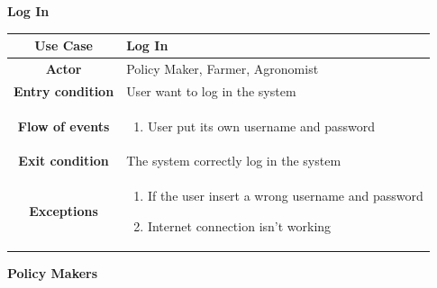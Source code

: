 \documentclass[table, 12pt]{article}
\begin{document}
\begin{itemize}
            \begin{table}[H]
                \item[] \textbf{Log In}
                \item[]  
                \centering
                \begin{tabular}{|c| m{}|}
                    \hline
                    \textbf{Use Case} & Log In\\ \hline
                    \textbf{Actor} & Policy Maker, Farmer, Agronomist\\ \hline
                    \textbf{Entry condition} & User want to log in the system\\  \hline
                    \textbf{Flow of events} & \begin{enumerate}
                                                \item User put its own username and password
                                            \end{enumerate}\\ \hline
                    \textbf{Exit condition} & The system correctly log in the system\\ \hline
                    \textbf{Exceptions} &  \begin{enumerate}
                        \item If the user insert a wrong username and password
                        \item Internet connection isn't working
                    \end{enumerate}\\ \hline                    
                \end{tabular}
            \end{table}

            \newpage
            \item \textbf{Policy Makers}
            

\end{itemize}
\end{document}
